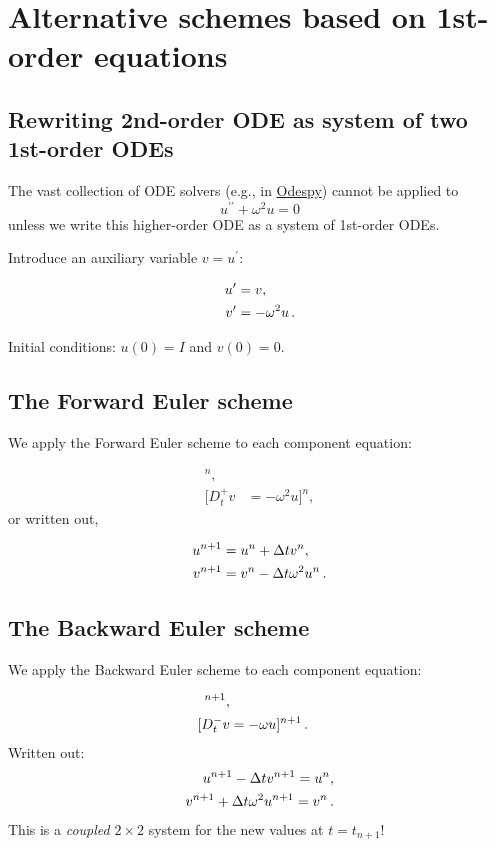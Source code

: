 \documentclass[%
oneside,                 %
final,                   %
10pt]{article}
\begin{document}
\noindent
\section*{Alternative schemes based on 1st-order equations}
\label{vib:model2x2}

\subsection*{Rewriting 2nd-order ODE as system of two 1st-order ODEs}

The vast collection of ODE solvers (e.g., in \href{{https://github.com/hplgit/odespy}}{Odespy}) cannot be applied to
\[ u^{\prime\prime} + \omega^2 u = 0\]
unless we write this higher-order ODE as a system of 1st-order ODEs.

Introduce an auxiliary variable $v=u^{\prime}$:

\begin{align}
u^{\prime} &= v,
\label{vib:model2x2:ueq}\\ 
v^{\prime} &= -\omega^2 u
\label{vib:model2x2:veq}
\tp
\end{align}

Initial conditions: $u(0)=I$ and $v(0)=0$.

\subsection*{The Forward Euler scheme}

We apply the Forward Euler scheme to each component equation:

\begin{align*}
[D_t^+ u &= v]^n,\\ 
[D_t^+ v &= -\omega^2 u]^n,
\end{align*}
or written out,

\begin{align}
u^{n+1} &= u^n + \Delta t v^n,\\ 
v^{n+1} &= v^n -\Delta t \omega^2 u^n
\tp
\end{align}

\subsection*{The Backward Euler scheme}

We apply the Backward Euler scheme to each component equation:

\begin{align}
 [D_t^- u &= v]^{n+1},\\ 
 [D_t^- v &= -\omega u]^{n+1} \tp
\end{align}
Written out:
\begin{align}
u^{n+1} - \Delta t v^{n+1} = u^{n},\\ 
v^{n+1} + \Delta t \omega^2 u^{n+1} = v^{n}
\tp
\end{align}
This is a \emph{coupled} $2\times 2$ system for the new values at $t=t_{n+1}$!
\end{document}
